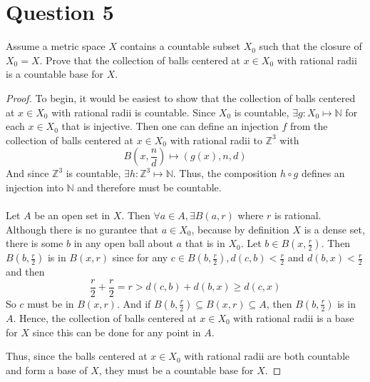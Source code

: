 \documentclass[12pt, letterpaper]{article}
\begin{document}
\section*{Question 5}
Assume a metric space $X$ contains a countable subset $X_0$ such that the closure of $X_0 = X$. Prove that the collection of balls centered at $x \in X_0$ with rational radii is a countable base for $X$.
\begin{proof}
  To begin, it would be easiest to show that the collection of balls centered at $x \in X_0$ with rational radii is countable. Since $X_0$ is countable, $\exists g: X_0 \mapsto \mathbb{N}$ for each $x \in X_0$ that is injective.
  Then one can define an injection $f$ from the collection of balls centered at $x \in X_0$ with rational radii to $\mathbb{Z}^3$ with
  $$ B(x, \frac{n}{d}) \mapsto (g(x), n, d)$$
  And since $\mathbb{Z}^3$ is countable, $\exists h: \mathbb{Z}^3 \mapsto \mathbb{N}$. Thus, the composition $h \circ g$ defines an injection into $\mathbb{N}$
  and therefore must be countable.\\
  \\
  Let $A$ be an open set in $X$. Then $\forall a\in A, \exists B(a, r)$ where $r$ is rational. Although there is no gurantee that $a \in X_0$, because by definition $X$ is a dense set,
  there is some $b$ in any open ball about $a$ that is in $X_0$. Let $b \in B(x, \frac{r}{2})$. Then $B(b, \frac{r}{2})$ is in $B(x, r)$ since for any $c \in B(b, \frac{r}{2}), d(c, b) < \frac{r}{2}$
  and $d(b, x) < \frac{r}{2}$ and then
  $$\frac{r}{2} + \frac{r}{2} = r > d(c, b) + d(b, x) \geq d(c, x) $$
  So $c$ must be in $B(x, r)$. And if $B(b, \frac{r}{2}) \subseteq B(x, r) \subseteq A$, then $B(b, \frac{r}{2})$ is in $A$.
  Hence, the collection of balls centered at $x \in X_0$ with rational radii is a base for $X$ since this can be done for any point in $A$.

  Thus, since the balls centered at $x \in X_0$ with rational radii are both countable and form a base of $X$, they must be a countable base for $X$.
\end{proof}
\end{document}
